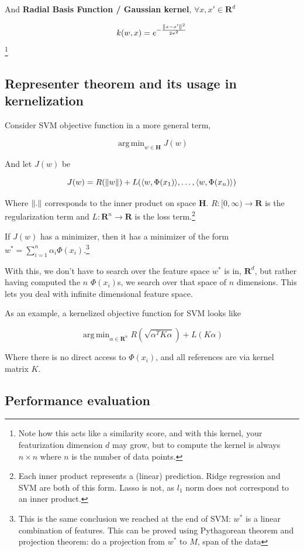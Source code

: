 \documentclass{article}
\DeclareMathOperator*{\argmin}{arg\,min}
\begin{document}
And \textbf{Radial Basis Function / Gaussian kernel}, $\forall x, x' \in \mathbf{R}^d$

$$
k(w, x) = e^{- \frac{\norm{x - x'}^2}{2 \sigma^2}}
$$\footnote{Note how this acts like a similarity score, and with this kernel, your featurization dimension $d$ may grow, but to compute the kernel is always $n \times n$ where $n$ is the number of data points.}


\subsection{Representer theorem and its usage in kernelization}

Consider SVM objective function in a more general term,

$$
\argmin_{w \in \mathbf{H}}{J(w)}
$$

And let $J(w)$ be

$$
J(w) = R(\norm{w}) + L(\langle w , \Phi(x_1) \rangle , \dots , \langle w , \Phi(x_n) \rangle)
$$

Where $\norm{.}$ corresponds to the inner product on space $\mathbf{H}$.
$R : [0, \infty) \to \mathbf{R}$ is the regularization term and $L : \mathbf{R}^n \to \mathbf{R}$ is the loss term.\footnote{Each inner product represents a (linear) prediction. Ridge regression and SVM are both of this form. Lasso is not, as $l_1$ norm does not correspond to an inner product.}

If $J(w)$ has a minimizer, then it has a minimizer of the form $w^* = \sum_{i = 1}^{n}{\alpha_i \Phi(x_i)}$.\footnote{This is the same conclusion we reached at the end of SVM: $w^*$ is a linear combination of features. This can be proved using Pythagorean theorem and projection theorem: do a projection from $w^*$ to $M$, span of the data}

With this, we don't have to search over the feature space $w^*$ is in, $\mathbf{R}^d$, but rather having computed the $n$ $\Phi(x_i)$s, we search over that space of $n$ dimensions.
This lets you deal with infinite dimensional feature space.

As an example, a kernelized objective function for SVM looks like

$$
\argmin_{\alpha \in \mathbf{R}^n} R(\sqrt{\alpha^T K \alpha}) + L(K \alpha)
$$

Where there is no direct access to $\Phi(x_i)$, and all references are via kernel matrix $K$.


\subsection{Performance evaluation}
\end{document}
